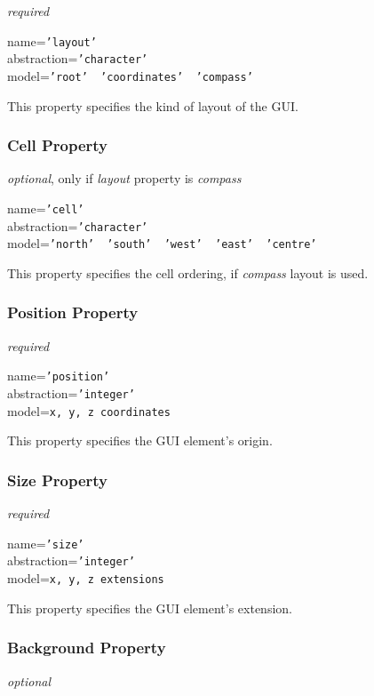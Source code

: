 \emph{required}

name=\texttt{'layout'}\\
abstraction=\texttt{'character'}\\
model=\texttt{'root' \vline\ 'coordinates' \vline\ 'compass'}

This property specifies the kind of layout of the GUI.

\subsubsection{Cell Property}

\emph{optional}, only if \emph{layout} property is \emph{compass}

name=\texttt{'cell'}\\
abstraction=\texttt{'character'}\\
model=\texttt{'north' \vline\ 'south' \vline\ 'west' \vline\ 'east' \vline\ 'centre'}

This property specifies the cell ordering, if \emph{compass} layout is used.

\subsubsection{Position Property}

\emph{required}

name=\texttt{'position'}\\
abstraction=\texttt{'integer'}\\
model=\texttt{x, y, z coordinates}

This property specifies the GUI element's origin.

\subsubsection{Size Property}

\emph{required}

name=\texttt{'size'}\\
abstraction=\texttt{'integer'}\\
model=\texttt{x, y, z extensions}

This property specifies the GUI element's extension.

\subsubsection{Background Property}

\emph{optional}

